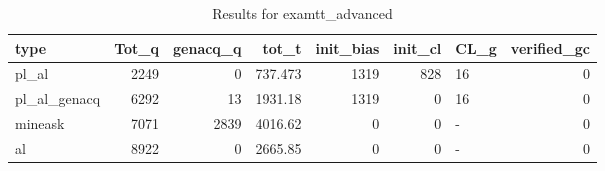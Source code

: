 \begin{table}[ht]
\caption{Results for examtt_advanced}
\begin{tabular}{lrrrrrlr}
\hline
 type         &   Tot\_q &   genacq\_q &    tot\_t &   init\_bias &   init\_cl & CL\_g   &   verified\_gc \\
\hline
 pl\_al        &    2249 &          0 &  737.473 &        1319 &       828 & 16     &             0 \\
 pl\_al\_genacq &    6292 &         13 & 1931.18  &        1319 &         0 & 16     &             0 \\
 mineask      &    7071 &       2839 & 4016.62  &           0 &         0 & -      &             0 \\
 al           &    8922 &          0 & 2665.85  &           0 &         0 & -      &             0 \\
\hline
\end{tabular}
\end{table}